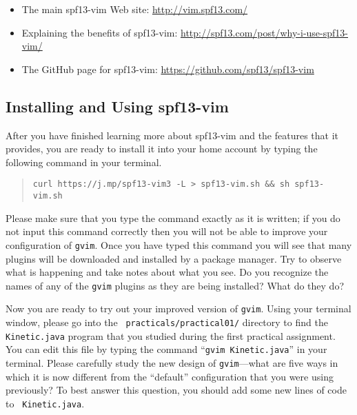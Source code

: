 \vspace*{-.1in}
\begin{itemize}
  \setlength{\itemsep}{.01in}
  \item The main spf13-vim Web site: \url{http://vim.spf13.com/}
  \item Explaining the benefits of spf13-vim: \url{http://spf13.com/post/why-i-use-spf13-vim/}
  \item The GitHub page for spf13-vim: \url{https://github.com/spf13/spf13-vim}
\end{itemize}

\vspace*{-.30in}
\subsection*{Installing and Using spf13-vim}
\vspace*{-.05in}

After you have finished learning more about spf13-vim and the features that it provides, you are ready to install it
into your home account by typing the following command in your terminal.

\vspace*{-.125in}
\begin{quote}
  {\tt curl https://j.mp/spf13-vim3 -L > spf13-vim.sh \&\& sh spf13-vim.sh}
\end{quote}
\vspace*{-.125in}

Please make sure that you type the command exactly as it is written; if you do not input this command correctly then you
will not be able to improve your configuration of {\tt gvim}. Once you have typed this command you will see that many
plugins will be downloaded and installed by a package manager.  Try to observe what is happening and take notes about
what you see. Do you recognize the names of any of the {\tt gvim} plugins as they are being installed? What do they do?

Now you are ready to try out your improved version of {\tt gvim}.  Using your terminal window, please go into the {\tt
  practicals/practical01/} directory to find the {\tt Kinetic.java} program that you studied during the first practical
assignment. You can edit this file by typing the command ``{\tt gvim Kinetic.java}'' in your terminal. Please carefully
study the new design of {\tt gvim}---what are five ways in which it is now different from the ``default'' configuration
that you were using previously? To best answer this question, you should add some new lines of code to {\tt
  Kinetic.java}.

